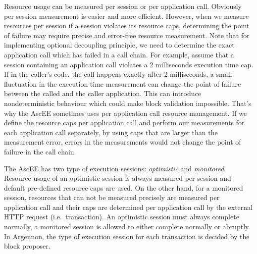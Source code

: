 Resource usage can be measured per session or per application call. Obviously per session measurement is
easier and more efficient. However, when we measure resources per session if
a session violates its resource caps, determining the point of failure may require precise and error-free resource
measurement. Note that for implementing optional decoupling principle, we need to determine the exact application call
which has failed in a call chain. For example, assume that a session containing an application call
violates a 2 milliseconds execution time cap. If in the caller's code, the call happens exactly after 2 milliseconds,
a small fluctuation in the execution time measurement can
change the point of failure between the called and the caller application. This can introduce nondeterministic
behaviour which could make block validation impossible. That's why the AscEE sometimes uses per application call
resource management. If we define the resource caps per application call and perform our measurements for each
application call separately, by using caps that are larger than the measurement error, errors in the
measurements would not change the point of failure in the call chain.

The AscEE has two type of execution sessions: \emph{optimistic} and \emph{monitored}. Resource usage of an optimistic
session is always measured per session and default pre-defined resource caps are used. On the other hand, for a
monitored session, resources that can not be measured precisely are measured per application call and their caps are
determined per application call by the external HTTP request (i.e.\ transaction). An optimistic session must
always complete normally, a monitored session is allowed to either complete normally or abruptly. In Argennon, the
type of execution session for each transaction is decided by the block proposer.

